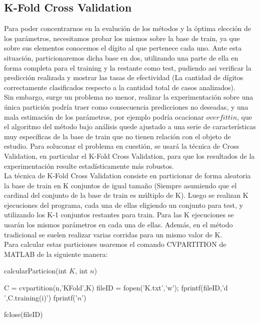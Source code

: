 \subsection{K-Fold Cross Validation}
Para poder concentrarnos en la evalución de los métodos y la óptima elección de los parámetros, necesitamos probar los mismos sobre la base de train, ya que sobre sus elementos conocemos el dígito al que pertenece cada uno. Ante esta situación, particionaremos dicha base en dos, utilizando una parte de ella en forma completa para el training y la restante como test, pudiendo asi verificar la predicción realizada y mostrar las tasas de efectividad (La cantidad de dígitos correctamente clasificados respecto a la cantidad total de casos analizados).\\
Sin embargo, surge un problema no menor, realizar la experimentación sobre una única partición podría traer como consecuencia predicciones no deseadas, y una mala estimación de los parámetros, por ejemplo podría ocacionar $overfittin$, que el algoritmo del método bajo análisis quede ajustado a una serie de características muy específicas de la base de train que no tienen relación con el objeto de estudio. Para soluconar el problema en cuestión, se usará la técnica de Cross Validation, en particular el K-Fold Cross Validation, para que los resultados de la experimentación resulte estadísticamente más robustos.\\
La técnica de K-Fold Cross Validation consiste en particionar de forma aleatoria la base de train en K conjuntos de igual tamaño (Siempre asumiendo que el cardinal del conjunto de la base de train es múltiplo de K).
Luego se realizan K ejecuciones del programa, cada una de ellas eligiendo un conjunto para test, y utilizando los K-1 conjuntos restantes para train. Para las K ejecuciones se usarán los mismos parámetros en cada una de ellas. Además, en el método tradicional se suelen realizar varias corridas para un mismo valor de K.\\
Para calcular estas particiones usaremos el comando CVPARTITION de MATLAB de la siguiente manera:\\
\begin{algorithm}[H]
\caption{calcularParticion(int $K$, int $n$)}
\begin{algorithmic}[1]
\State C = cvpartition(n,'KFold',K)
\State fileID = fopen('K.txt','w');
	\State fprintf(fileID,'d ',C.training(i)')
	\State fprintf('$n$')
\EndFor

\State fclose(fileID)

\end{algorithmic}
\end{algorithm}

